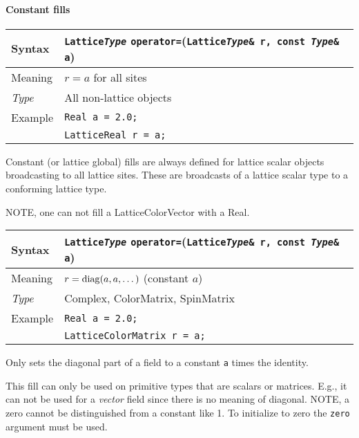 \documentclass[12pt,letterpaper]{article}
\newcommand{\diag}{\mathop{\rm diag}}
\newcommand{\tLatticeReal}{LatticeReal}
\newcommand{\tLatticeColorMatrix}{LatticeColorMatrix}
\newcommand{\tReal}{Real}
\newcommand{\tComplex}{Complex}
\newcommand{\tColorMatrix}{ColorMatrix}
\newcommand{\tSpinMatrix}{SpinMatrix}
\newcommand{\tLatticeColorVector}{LatticeColorVector}
\newcommand{\itt}{\it Type}
\begin{document}
\paragraph{Constant fills}

\begin{flushleft}
  \begin{tabular}{|l|l|}
  \hline
  Syntax      & {\tt Lattice{\it Type}} \verb|operator=|({\tt Lattice{\it Type}\& r, const {\it Type}\& a})\\
  \hline
  Meaning     & $r = a$ for all sites\\
  \hline
  \itt        & All non-lattice objects \\
  \hline
  Example     & {\tt \tReal{} a = 2.0;}\\
              & {\tt \tLatticeReal{} r = a;}\\
  \hline
  \end{tabular}
\end{flushleft}

Constant (or lattice global) fills are always defined for lattice scalar objects broadcasting to
all lattice sites. These are broadcasts of a lattice scalar type to a conforming lattice type.

NOTE, one can not fill a \tLatticeColorVector{} with a \tReal.

\begin{flushleft}
  \begin{tabular}{|l|l|}
  \hline
  Syntax      & {\tt Lattice{\it Type}} \verb|operator=|({\tt Lattice{\it Type}\& r, const {\it Type}\& a})\\
  \hline
  Meaning     & $r = \diag(a,a,\ldots{})$ (constant $a$)\\
  \hline
  \itt        & \tComplex, \tColorMatrix, \tSpinMatrix \\
  \hline
  Example     & {\tt \tReal{} a = 2.0;}\\
              & {\tt \tLatticeColorMatrix{} r = a;}\\
  \hline
  \end{tabular}
\end{flushleft}

Only sets the diagonal part of a field to a constant \verb|a| times
the identity.

This fill can only be used on primitive types that are scalars or
matrices. E.g., it can not be used for a {\it vector} field since
there is no meaning of diagonal.  NOTE, a zero cannot be distinguished
from a constant like 1. To initialize to zero the \verb|zero| argument
must be used.
\end{document}
